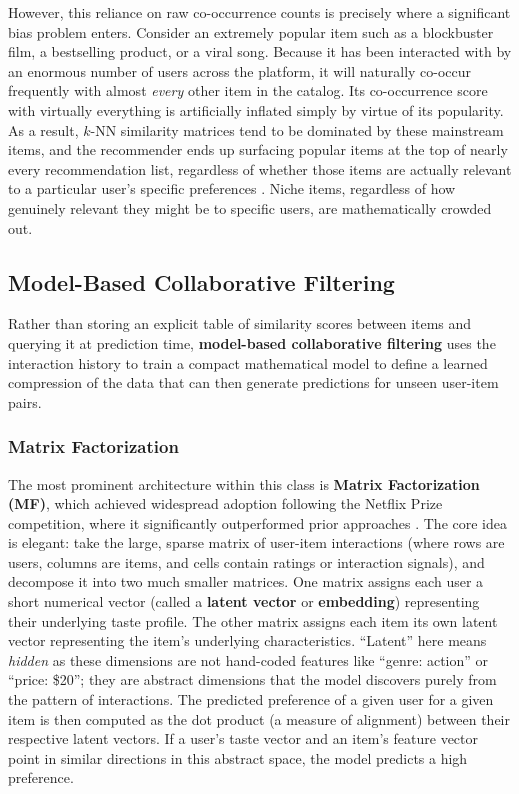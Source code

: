 \documentclass[11pt,a4paper]{report}
\begin{document}
However, this reliance on raw co-occurrence counts is precisely where a significant bias problem enters. Consider an extremely popular item such as a blockbuster film, a bestselling product, or a viral song. Because it has been interacted with by an enormous number of users across the platform, it will naturally co-occur frequently with almost \emph{every} other item in the catalog. Its co-occurrence score with virtually everything is artificially inflated simply by virtue of its popularity. As a result, $k$-NN similarity matrices tend to be dominated by these mainstream items, and the recommender ends up surfacing popular items at the top of nearly every recommendation list, regardless of whether those items are actually relevant to a particular user's specific preferences \citep{kowald2022multimedia}. Niche items, regardless of how genuinely relevant they might be to specific users, are mathematically crowded out.

\subsection{Model-Based Collaborative Filtering}

Rather than storing an explicit table of similarity scores between items and querying it at prediction time, \textbf{model-based collaborative filtering} uses the interaction history to train a compact mathematical model to define a learned compression of the data that can then generate predictions for unseen user-item pairs.

\subsubsection*{Matrix Factorization}

The most prominent architecture within this class is \textbf{Matrix Factorization (MF)}, which achieved widespread adoption following the Netflix Prize competition, where it significantly outperformed prior approaches \citep{koren2009matrix}. The core idea is elegant: take the large, sparse matrix of user-item interactions (where rows are users, columns are items, and cells contain ratings or interaction signals), and decompose it into two much smaller matrices. One matrix assigns each user a short numerical vector (called a \textbf{latent vector} or \textbf{embedding}) representing their underlying taste profile. The other matrix assigns each item its own latent vector representing the item's underlying characteristics. ``Latent'' here means \emph{hidden} as these dimensions are not hand-coded features like ``genre: action'' or ``price: \$20''; they are abstract dimensions that the model discovers purely from the pattern of interactions. The predicted preference of a given user for a given item is then computed as the dot product (a measure of alignment) between their respective latent vectors. If a user's taste vector and an item's feature vector point in similar directions in this abstract space, the model predicts a high preference.
\end{document}

